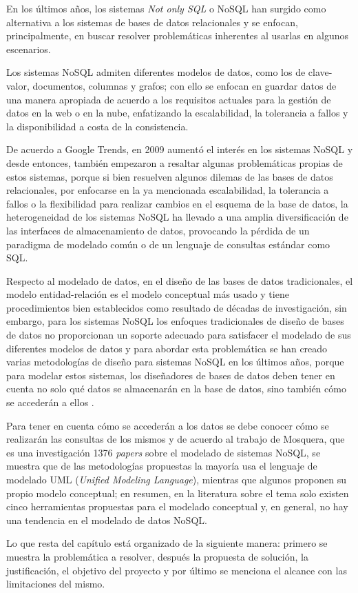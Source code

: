 En los últimos años, los sistemas \textit{Not only SQL} o NoSQL han surgido como alternativa a los sistemas de bases de datos relacionales y se enfocan, principalmente, en buscar resolver problemáticas inherentes al usarlas en algunos escenarios.


Los sistemas NoSQL admiten diferentes modelos de datos, como los de clave-valor, documentos, columnas y grafos; con ello se enfocan en guardar datos de una manera apropiada de acuerdo a los requisitos actuales para la gestión de datos en la web o en la nube, enfatizando la escalabilidad, la tolerancia a fallos y la disponibilidad a costa de la consistencia.


De acuerdo a Google Trends, en 2009 aumentó el interés en los sistemas NoSQL y desde entonces, también empezaron a resaltar algunas problemáticas propias de estos sistemas, porque si bien resuelven algunos dilemas de las bases de datos relacionales, por enfocarse en la ya mencionada escalabilidad, la tolerancia a fallos o la flexibilidad para realizar cambios en el esquema de la base de datos, la heterogeneidad de los sistemas NoSQL ha llevado a una amplia diversificación de las interfaces de almacenamiento de datos, provocando la pérdida de un paradigma de modelado común o de un lenguaje de consultas estándar como SQL.


Respecto al modelado de datos, en el diseño de las bases de datos tradicionales, el modelo entidad-relación\cite{codd_relational_nodate} es el modelo conceptual más usado y tiene procedimientos bien establecidos como resultado de décadas de investigación, sin embargo, para los sistemas NoSQL los enfoques tradicionales de diseño de bases de datos no proporcionan un soporte adecuado para satisfacer el modelado de sus diferentes modelos de datos y para abordar esta problemática se han creado varias metodologías de diseño para sistemas NoSQL en los últimos años, porque para modelar estos sistemas, los diseñadores de bases de datos deben tener en cuenta no solo qué datos se almacenarán en la base de datos, sino también cómo se accederán a ellos \cite{li_transforming_2010,chebotko_big_2015,mior_nose_2017}. 


Para tener en cuenta cómo se accederán a los datos se debe conocer cómo se realizarán las consultas de los mismos y de acuerdo al trabajo de Mosquera\cite{martinez-mosquera_modeling_2020}, que es una investigación 1376 \textit{papers} sobre el modelado de sistemas NoSQL, se muestra que de las metodologías propuestas la mayoría usa el lenguaje de modelado UML (\textit{Unified Modeling Language}), mientras que algunos proponen su propio modelo conceptual; en resumen, en la literatura sobre el tema solo existen cinco herramientas propuestas para el modelado conceptual y, en general, no hay una tendencia en el modelado de datos NoSQL.


Lo que resta del capítulo está organizado de la siguiente manera: primero se muestra la problemática a resolver, después la propuesta de solución, la justificación, el objetivo del proyecto y por último se menciona el alcance con las limitaciones del mismo.






